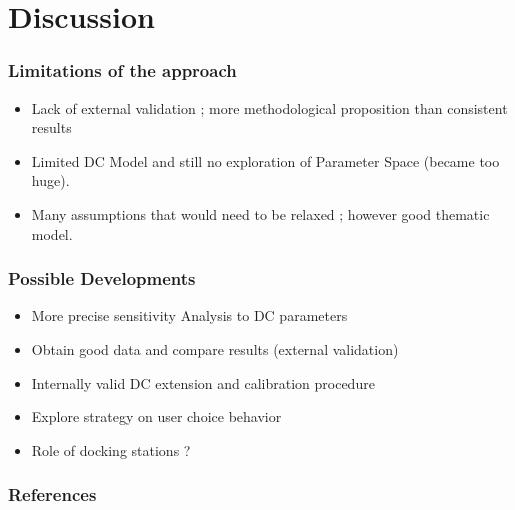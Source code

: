 \documentclass[english,10pt]{beamer}
\begin{document}
\section{Discussion}

\begin{frame}
\frametitle{Limitations of the approach}
\begin{itemize}
\item Lack of external validation ; more methodological proposition than consistent results
\item Limited DC Model and still no exploration of Parameter Space (became too huge).
\item Many assumptions that would need to be relaxed ; however good thematic model.
\end{itemize}
\end{frame}


\begin{frame}
\frametitle{Possible Developments}
\begin{itemize}
\item More precise sensitivity Analysis to DC parameters
\item Obtain good data and compare results (external validation)
\item Internally valid DC extension and calibration procedure
\item Explore strategy on user choice behavior
\item Role of docking stations ?

\end{itemize}

\end{frame}








\begin{frame}[allowframebreaks]
\frametitle{References}


\end{frame}


\end{document}
